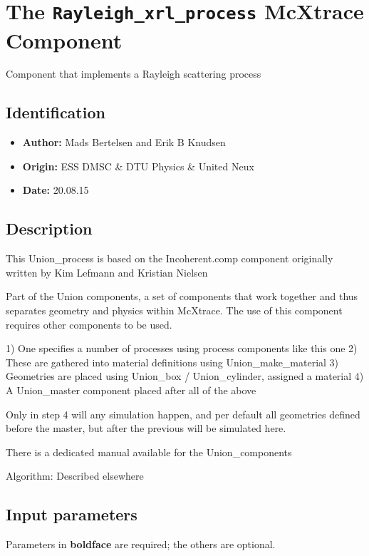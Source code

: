 \section{The \texttt{Rayleigh\_xrl\_process} McXtrace Component}
Component that implements a Rayleigh scattering process

\subsection*{Identification}
\begin{itemize}
  \item \textbf{Author:} Mads Bertelsen and Erik B Knudsen
  \item \textbf{Origin:} ESS DMSC \& DTU Physics \& United Neux
  \item \textbf{Date:} 20.08.15
\end{itemize}

\subsection*{Description}
This Union\_process is based on the Incoherent.comp component originally written by Kim Lefmann and Kristian Nielsen

Part of the Union components, a set of components that work together and thus separates geometry and physics within McXtrace. The use of this component requires other components to be used.

1) One specifies a number of processes using process components like this one 2) These are gathered into material definitions using Union\_make\_material 3) Geometries are placed using Union\_box / Union\_cylinder, assigned a material 4) A Union\_master component placed after all of the above

Only in step 4 will any simulation happen, and per default all geometries defined before the master, but after the previous will be simulated here.

There is a dedicated manual available for the Union\_components

Algorithm: Described elsewhere

\subsection*{Input parameters}
Parameters in \textbf{boldface} are required; the others are optional.

